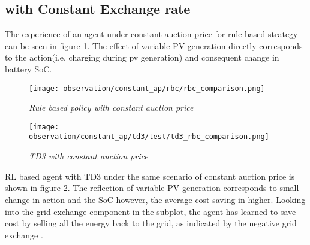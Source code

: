 \begin{large}
\subsection*{with Constant Exchange rate}

The experience of an agent under constant auction price for rule based strategy can be seen in figure \ref{fig:test_compare_constant_ap_rbc}. The effect of variable PV generation directly corresponds to the action(i.e. charging during pv generation) and consequent change in battery SoC. \\

\begin{figure}[h]
	\begin{center}
		\texttt{[image: observation/constant\_ap/rbc/rbc\_comparison.png]}
		\caption{ \textit{Rule based policy with constant auction price} }
		\label{fig:test_compare_constant_ap_rbc}
	\end{center}
\end{figure}

\begin{figure}[h]
	\begin{center}
		\texttt{[image: observation/constant\_ap/td3/test/td3\_rbc\_comparison.png]}
		\caption{ \textit{TD3 with constant auction price} }
		\label{fig:test_compare_constant_ap_td3}
	\end{center}
\end{figure}

RL based agent with TD3 under the same scenario of constant auction price is shown in figure \ref{fig:test_compare_constant_ap_td3}. The reflection of variable PV generation corresponds to small change in action and the SoC however, the average cost saving in higher. Looking into the grid exchange component in the subplot, the agent has learned to save cost by selling  all the energy back to the grid, as indicated by the negative grid exchange . \\


\end{large}
